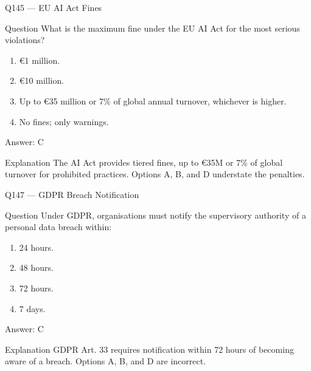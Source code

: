 \documentclass[aspectratio=169,8pt]{beamer}
\begin{document}
\begin{frame}{Q145 --- EU AI Act Fines}
\begin{block}{Question}
What is the maximum fine under the EU AI Act for the most serious violations?
\begin{enumerate}
\item €1 million.
\item €10 million.
\item Up to €35 million or 7\% of global annual turnover, whichever is higher.
\item No fines; only warnings.
\end{enumerate} 	\end{block}
\begin{exampleblock}{Answer: C}\end{exampleblock}
\begin{block}{Explanation}
The AI Act provides tiered fines, up to €35M or 7\% of global turnover for prohibited practices. Options A, B, and D understate the penalties.
\end{block}
\end{frame}



\begin{frame}{Q147 --- GDPR Breach Notification}
\begin{block}{Question}
Under GDPR, organisations must notify the supervisory authority of a personal data breach within:
\begin{enumerate}
\item 24 hours.
\item 48 hours.
\item 72 hours.
\item 7 days.
\end{enumerate} 	\end{block}
\begin{exampleblock}{Answer: C}\end{exampleblock}
\begin{block}{Explanation}
GDPR Art. 33 requires notification within 72 hours of becoming aware of a breach. Options A, B, and D are incorrect.
\end{block}
\end{frame}
\end{document}
